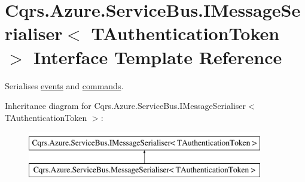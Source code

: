 \hypertarget{interfaceCqrs_1_1Azure_1_1ServiceBus_1_1IMessageSerialiser}{}\section{Cqrs.\+Azure.\+Service\+Bus.\+I\+Message\+Serialiser$<$ T\+Authentication\+Token $>$ Interface Template Reference}
\label{interfaceCqrs_1_1Azure_1_1ServiceBus_1_1IMessageSerialiser}


Serialises \hyperlink{}{events} and \hyperlink{}{commands}.  


Inheritance diagram for Cqrs.\+Azure.\+Service\+Bus.\+I\+Message\+Serialiser$<$ T\+Authentication\+Token $>$\+:\begin{figure}[H]
\begin{center}
\leavevmode
\includegraphics[height=2.000000cm]{interfaceCqrs_1_1Azure_1_1ServiceBus_1_1IMessageSerialiser}
\end{center}
\end{figure}
